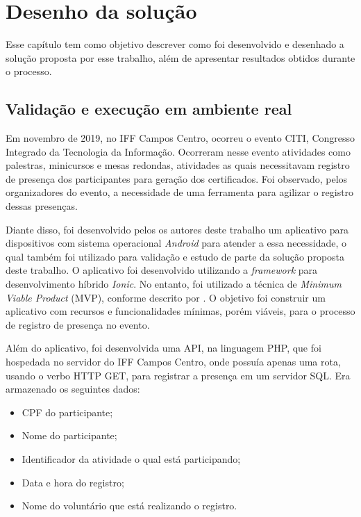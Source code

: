 \chapter{Desenho da solução}

Esse capítulo tem como objetivo descrever como foi desenvolvido e desenhado a solução proposta por esse trabalho, além de apresentar resultados obtidos durante o processo.

\section{Validação e execução em ambiente real}

Em novembro de 2019, no IFF Campos Centro, ocorreu o evento CITI, Congresso Integrado da Tecnologia da Informação. Ocorreram nesse evento atividades como palestras, minicursos e mesas redondas, atividades as quais necessitavam registro de presença dos participantes para geração dos certificados. Foi observado, pelos organizadores do evento, a necessidade de uma ferramenta para agilizar o registro dessas presenças. 

Diante disso, foi desenvolvido pelos os autores deste trabalho um aplicativo para dispositivos com sistema operacional \textit{Android} para atender a essa necessidade, o qual também foi utilizado para validação e estudo de parte da solução proposta deste trabalho. O aplicativo foi desenvolvido utilizando a \textit{framework} para desenvolvimento híbrido \textit{Ionic}. No entanto, foi utilizado a técnica de \textit{Minimum Viable Product} (MVP), conforme descrito por . O objetivo foi construir um aplicativo com recursos e funcionalidades mínimas, porém viáveis, para o processo de registro de presença no evento.

Além do aplicativo, foi desenvolvida uma API, na linguagem PHP, que foi hospedada no servidor do IFF Campos Centro, onde possuía apenas uma rota, usando o verbo HTTP GET, para registrar a presença em um servidor SQL. Era armazenado os seguintes dados:

\begin{itemize}
    \item CPF do participante;
    \item Nome do participante;
    \item Identificador da atividade o qual está participando;
    \item Data e hora do registro;
    \item Nome do voluntário que está realizando o registro.
\end{itemize}

